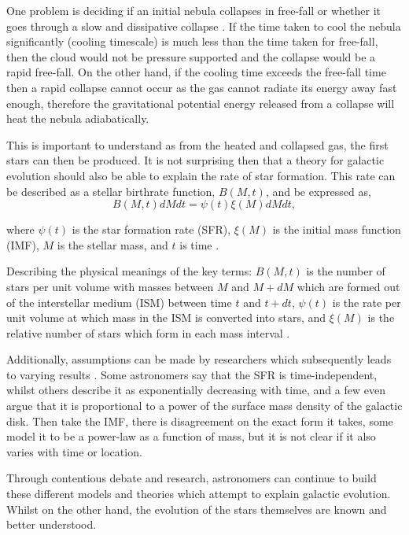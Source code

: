 \documentclass[12pt, twocolumn]{revtex4}    %
\begin{document}
One problem is deciding if an initial nebula collapses in free-fall or whether it goes through a slow and dissipative collapse \citep{carroll_astro}. If the time taken to cool the nebula significantly (cooling timescale) is much less than the time taken for free-fall, then the cloud would not be pressure supported and the collapse would be a rapid free-fall. On the other hand, if the cooling time exceeds the free-fall time then a rapid collapse cannot occur as the gas cannot radiate its energy away fast enough, therefore the gravitational potential energy released from a collapse will heat the nebula adiabatically. 

This is important to understand as from the heated and collapsed gas, the first stars can then be produced. It is not surprising then that a theory for galactic evolution should also be able to explain the rate of star formation. This rate can be described as a stellar birthrate function, $B(M,t)$, and be expressed as,
\begin{equation}
B(M,t)dM dt = \psi (t) \xi (M) dM dt, 
\label{eqn:stellar_birth_rate}
\end{equation}

where $\psi(t)$ is the star formation rate (SFR), $\xi (M)$ is the initial mass function (IMF), $M$ is the stellar mass, and $t$ is time \citep{carroll_astro}. 

Describing the physical meanings of the key terms: $B(M,t)$ is the number of stars per unit volume with masses between $M$ and $M+dM$ which are formed out of the interstellar medium (ISM) between time $t$ and $t+dt$, $\psi(t)$ is the rate per unit volume at which mass in the ISM is converted into stars, and $\xi(M)$ is the relative number of stars which form in each mass interval \citep{carroll_astro}. 

Additionally, assumptions can be made by researchers which subsequently leads to varying results \citep{carroll_astro}. Some astronomers say that the SFR is time-independent, whilst others describe it as exponentially decreasing with time, and a few even argue that it is proportional to a power of the surface mass density of the galactic disk. Then take the IMF, there is disagreement on the exact form it takes, some model it to be a power-law as a function of mass, but it is not clear if it also varies with time or location.

Through contentious debate and research, astronomers can continue to build these different models and theories which attempt to explain galactic evolution. Whilst on the other hand, the evolution of the stars themselves are known and better understood. 
\end{document}
